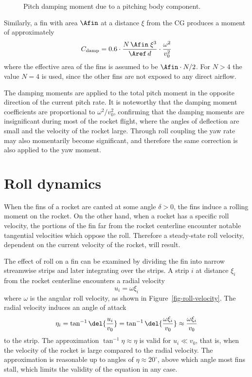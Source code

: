 \begin{figure}
\centering
{}
\caption{Pitch damping moment due to a pitching body component.}
\label{fig-pitch-velocity}
\end{figure}



Similarly, a fin with area $\Afin$ at a distance $\xi$ from the CG
produces a moment of approximately
%
\begin{equation}
C_{\rm damp} = 
    0.6\cdot \frac{N\,\Afin\;\xi^3}{\Aref\,d}\cdot\frac{\omega^2}{v_0^2}
\end{equation}
%
where the effective area of the fins is assumed to be 
$\Afin\cdot N/2$.  For $N>4$ the value $N=4$ is used, since the other
fins are not exposed to any direct airflow.

The damping moments are applied to the total pitch moment in the
opposite direction of the current pitch rate.  It is noteworthy
that the damping moment coefficients are proportional to $\omega^2/v_0^2$,
confirming that the damping moments are insignificant during most of
the rocket flight, where the angles of deflection are small and the
velocity of the rocket large.  Through roll coupling the yaw rate may also
momentarily become significant, and therefore the same correction is
also applied to the yaw moment.





\clearpage
\section{Roll dynamics}
\label{sec-roll-dynamics}

When the fins of a rocket are canted at some angle $\delta>0$, the
fins induce a rolling moment on the rocket.  On the other hand, when a
rocket has a specific roll velocity, the portions of the fin far from
the rocket centerline encounter notable tangential velocities
which oppose the roll.  Therefore a steady-state roll velocity,
dependent on the current velocity of the rocket, will result.

The effect of roll on a fin can be examined by dividing the fin into
narrow streamwise strips and later integrating over the strips.  A
strip $i$ at distance $\xi_i$ from the rocket centerline encounters a
radial velocity
%
\begin{equation}
u_i = \omega \xi_i
\end{equation}
%
where $\omega$ is the angular roll velocity, as shown in
Figure~\ref{fig-roll-velocity}.  The radial velocity induces an angle
of attack
%
\begin{equation}
\eta_i = \tan^{-1} \del{\frac{u_i}{v_0}} =
\tan^{-1}\del{\frac{\omega\xi_i}{v_0}}
\approx \frac{\omega\xi_i}{v_0}
\label{eq-tan-approx}
\end{equation}
%
to the strip.  The approximation $\tan^{-1} \eta \approx \eta$ is
valid for $u_i\ll v_0$, that is, when the velocity of the rocket is
large compared to the radial velocity.  The approximation is
reasonable up to angles of $\eta \approx 20^\circ$, above which angle
most fins stall, which limits the validity of the equation in any
case.  

